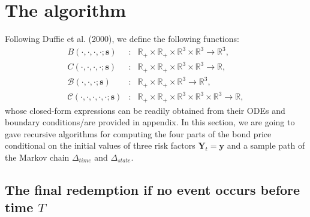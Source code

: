 \documentclass[11pt]{article}
\numberwithin{equation}{section}
\begin{document}
\section{The algorithm}

Following Duffie et al. (2000), we define the following functions:%
\begin{eqnarray*}
B\left( \cdot ,\cdot ,\cdot ,\cdot ;\mathbf{s}\right) &:&\mathbb{R}%
_{+}\times \mathbb{R}_{+}\times \mathbb{R}^{3}\times \mathbb{R}%
^{3}\rightarrow \mathbb{R}^{3}, \\
C\left( \cdot ,\cdot ,\cdot ,\cdot ;\mathbf{s}\right) &:&\mathbb{R}%
_{+}\times \mathbb{R}_{+}\times \mathbb{R}^{3}\times \mathbb{R}%
^{3}\rightarrow \mathbb{R}, \\
\mathcal{B}\left( \cdot ,\cdot ,\cdot ;\mathbf{s}\right) &:&\mathbb{R}%
_{+}\times \mathbb{R}_{+}\times \mathbb{R}^{3}\rightarrow \mathbb{R}^{3}, \\
\mathcal{C}\left( \cdot ,\cdot ,\cdot ,\cdot ,\cdot ;\mathbf{s}\right) &:&%
\mathbb{R}_{+}\times \mathbb{R}_{+}\times \mathbb{R}^{3}\times \mathbb{R}%
^{3}\times \mathbb{R}^{3}\rightarrow \mathbb{R},
\end{eqnarray*}
whose closed-form expressions can be readily obtained from their ODEs and
boundary conditions/are provided in appendix. In this section, we are going
to gave recursive algorithms for computing the four parts of the bond price
conditional on the initial values of three risk factors $\mathbf{Y}_t=%
\mathbf{y}$ and a sample path of the Markov chain $\Delta_{time}$ and $%
\Delta_{state}$.

\subsection{The final redemption if no event occurs before time $T$}
\end{document}
